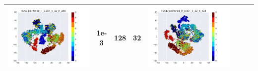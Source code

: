 \documentclass[12pt]{report}
\begin{document}
\begin{table}[H]
\begin{tabular}{ | c | c | c | c || c | c | c| c |}
\begin{minipage}{.3\textwidth}
      \includegraphics[scale=0.25]{cd_lr_0_001_k_32_n_256.png}
    \end{minipage}
     & 1e-3 & 128 & 32 &
    \begin{minipage}{.3\textwidth}
      \includegraphics[scale=0.25]{cd_lr_0_001_k_32_n_128.png}
    \end{minipage}
    \\ \hline
  \end{tabular}
\end{table}
\end{document}
